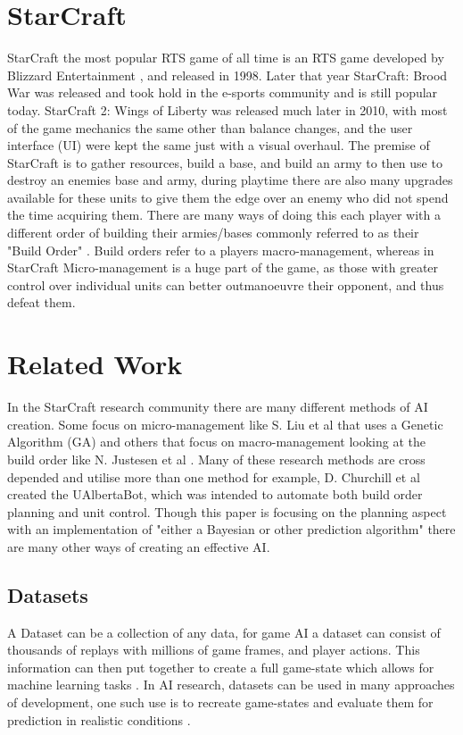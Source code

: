 \documentclass[journal]{IEEEtran}
\begin{document}
\section{StarCraft}
StarCraft the most popular RTS game of all time \cite{Current} is an RTS game developed by Blizzard Entertainment \cite{Blizzard}\cite{Release}, and released in 1998. Later that year StarCraft: Brood War was released and took hold in the e-sports community and is still popular today. StarCraft 2: Wings of Liberty was released much later in 2010, with most of the game mechanics the same other than balance changes, and the user interface (UI) were kept the same just with a visual overhaul. The premise of StarCraft is to gather resources, build a base, and build an army to then use to destroy an enemies base and army, during playtime there are also many upgrades available for these units to give them the edge over an enemy who did not spend the time acquiring them. There are many ways of doing this each player with a different order of building their armies/bases commonly referred to as their "Build Order" \cite{BuildOrder}. Build orders refer to a players macro-management, whereas in StarCraft Micro-management is a huge part of the game, as those with greater control over individual units can better outmanoeuvre their opponent, and thus defeat them. 

\section{Related Work}
In the StarCraft research community there are many different methods of AI creation. Some focus on micro-management like S. Liu et al \cite{EffectiveMicro} that uses a Genetic Algorithm (GA) and others that focus on macro-management looking at the build order like N. Justesen et al \cite{OnlineEvo}. Many of these research methods are cross depended and utilise more than one method for example, D. Churchill et al \cite{Agents} created the UAlbertaBot, which was intended to automate both build order planning and unit control. Though this paper is focusing on the planning aspect with an implementation of "either a Bayesian or other prediction algorithm" there are many other ways of creating an effective AI.

\subsection{Datasets}
A Dataset can be a collection of any data, for game AI a dataset can consist of thousands of replays with millions of game frames, and player actions\cite{Dataset}. This information can then put together to create a full game-state which allows for machine learning tasks \cite{Dataset17}. In AI research, datasets can be used in many approaches of development, one such use is to recreate game-states and evaluate them for prediction in realistic conditions \cite{SpecialTactics}.
\end{document}
